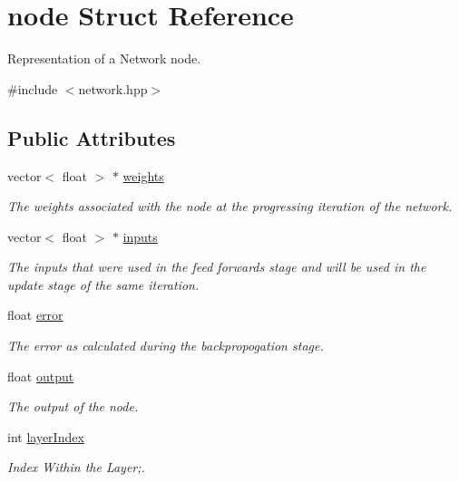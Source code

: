 \hypertarget{structnode}{}\section{node Struct Reference}
\label{structnode}


Representation of a Network node.  




{\ttfamily \#include $<$network.\+hpp$>$}

\subsection*{Public Attributes}
\begin{DoxyCompactItemize}
\item 
vector$<$ float $>$ $\ast$ \hyperlink{structnode_a641a543a1870b1daa208ca9a6bf456c7}{weights}
\begin{DoxyCompactList}\small\item\em The weights associated with the node at the progressing iteration of the network. \end{DoxyCompactList}\item 
vector$<$ float $>$ $\ast$ \hyperlink{structnode_a86d96e3a79362efaad880cbf8ab1bc82}{inputs}
\begin{DoxyCompactList}\small\item\em The inputs that were used in the feed forwards stage and will be used in the update stage of the same iteration. \end{DoxyCompactList}\item 
float \hyperlink{structnode_a3e5a0f865fedde6b380007420c5f5e0d}{error}
\begin{DoxyCompactList}\small\item\em The error as calculated during the backpropogation stage. \end{DoxyCompactList}\item 
float \hyperlink{structnode_a75af99a1fe4193c4ba2e85ba767a859d}{output}
\begin{DoxyCompactList}\small\item\em The output of the node. \end{DoxyCompactList}\item 
\hypertarget{structnode_a409c8b257d1f7afb9a2cb673c2996f34}{}\label{structnode_a409c8b257d1f7afb9a2cb673c2996f34} 
int \hyperlink{structnode_a409c8b257d1f7afb9a2cb673c2996f34}{layer\+Index}
\begin{DoxyCompactList}\small\item\em Index Within the Layer;. \end{DoxyCompactList}\end{DoxyCompactItemize}


